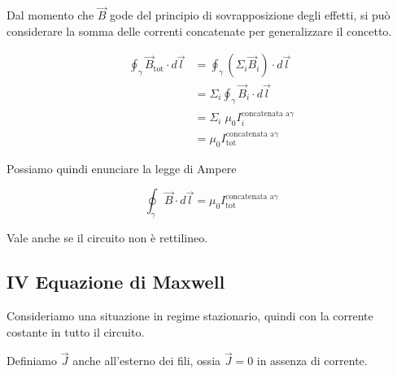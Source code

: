 Dal momento che $ \vec{B}  $ gode del principio di sovrapposizione degli effetti, si può considerare la somma delle correnti concatenate per generalizzare il concetto.

\begin{align*}
	\oint_{\gamma} \vec{B}_{\text{tot}}\cdot d\vec{l} &=  \oint_{\gamma} (\Sigma_i\vec{B}_i  ) \cdot d\vec{l} \\
	&= \Sigma_i \oint_{\gamma} \vec{B}_i\cdot d\vec{l} \\
	&= \Sigma_i \; \mu_0 I_i^{\text{concatenata a}\gamma} \\
	&= \mu_0 I_{\text{tot}}^{\text{concatenata a}\gamma}
\end{align*}

Possiamo quindi enunciare la legge di Ampere

\[
	\boxed{\oint_{\gamma} \vec{B} \cdot d\vec{l} = \mu_0 I^{\text{concatenata a}\gamma}_{\text{tot}}}
\]

Vale anche se il circuito non è rettilineo.

\subsection{IV Equazione di Maxwell}

Consideriamo una situazione in regime stazionario, quindi con la corrente costante in tutto il circuito.

Definiamo $\vec{J}$ anche all'esterno dei fili, ossia $\vec{J}=0$ in assenza di corrente.

